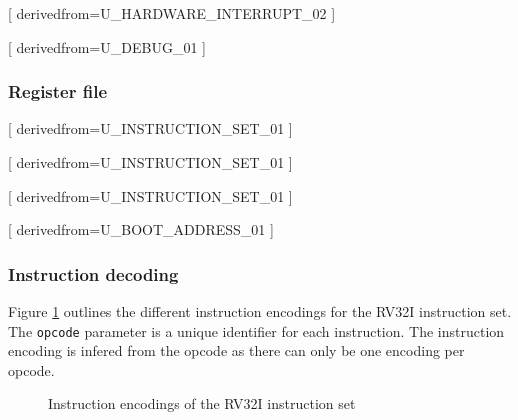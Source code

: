       [
          derivedfrom=U\_HARDWARE\_INTERRUPT\_02
        ]

      [
          derivedfrom=U\_DEBUG\_01
        ]

    \subsubsection{Register file}

      [
          derivedfrom=U\_INSTRUCTION\_SET\_01
        ]

      [
          derivedfrom=U\_INSTRUCTION\_SET\_01
        ]

      [
          derivedfrom=U\_INSTRUCTION\_SET\_01
        ]

    [
        derivedfrom=U\_BOOT\_ADDRESS\_01
      ]

    \subsubsection{Instruction decoding}

      \begin{content}
          Figure \ref{fig:instructionencoding} outlines the different instruction encodings for the RV32I instruction set. The \texttt{opcode} parameter is a unique identifier for each instruction. The instruction encoding is infered from the opcode as there can only be one encoding per opcode.
        \end{content}

      \begin{figure}[h!]
          \centering
          
          \caption{Instruction encodings of the RV32I instruction set}
          \label{fig:instructionencoding}
        \end{figure}

